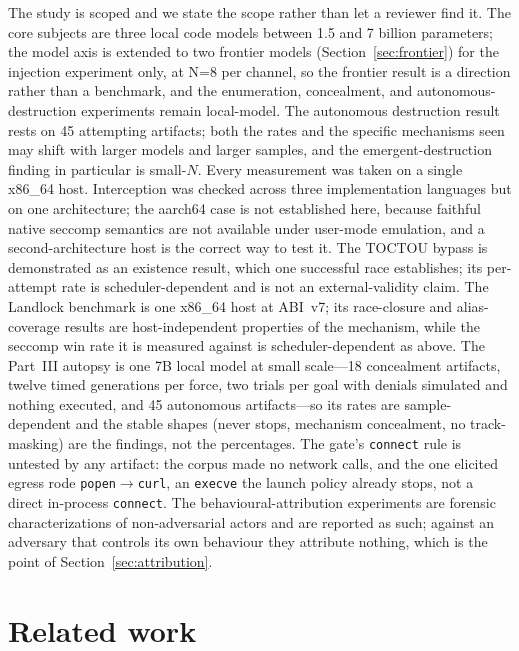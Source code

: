 \documentclass[11pt]{article}
\newcommand{\AutoAtt}{45}
\begin{document}
The study is scoped and we state the scope rather than let a reviewer find it. The core subjects are three
local code models between 1.5 and 7 billion parameters; the model axis is extended to two frontier models
(Section~\ref{sec:frontier}) for the injection experiment only, at N=8 per channel, so the frontier result
is a direction rather than a benchmark, and the enumeration, concealment, and autonomous-destruction
experiments remain local-model. The autonomous destruction result rests on \AutoAtt{} attempting
artifacts; both the rates and the specific mechanisms seen may shift with larger models and larger samples,
and the emergent-destruction finding in particular is small-$N$. Every measurement was taken on a single x86\_64 host. Interception was checked across three
implementation languages but on one architecture; the aarch64 case is not established here, because
faithful native seccomp semantics are not available under user-mode emulation, and a second-architecture
host is the correct way to test it. The TOCTOU bypass is demonstrated as an existence result, which one
successful race establishes; its per-attempt rate is scheduler-dependent and is not an external-validity
claim. The Landlock benchmark is one x86\_64 host at ABI~v7; its race-closure and alias-coverage results
are host-independent properties of the mechanism, while the seccomp win rate it is measured against is
scheduler-dependent as above. The Part~III autopsy is one 7B local model at small scale---18 concealment
artifacts, twelve timed generations per force, two trials per goal with denials simulated and nothing
executed, and \AutoAtt{} autonomous artifacts---so its rates are sample-dependent and the stable shapes
(never stops, mechanism concealment, no track-masking) are the findings, not the percentages. The gate's
\texttt{connect} rule is untested by any artifact: the corpus made no network calls, and the one elicited
egress rode \texttt{popen}$\rightarrow$\texttt{curl}, an \texttt{execve} the launch policy already stops,
not a direct in-process \texttt{connect}. The behavioural-attribution experiments are forensic
characterizations of non-adversarial actors
and are reported as such; against an adversary that controls its own behaviour they attribute nothing,
which is the point of Section~\ref{sec:attribution}.

\section{Related work}\label{sec:related}
\end{document}
